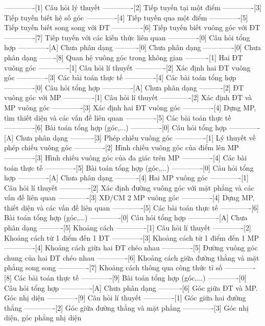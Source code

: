 -------------[1] Câu hỏi lý thuyết
-------------[2] Tiếp tuyến tại một điểm
-------------[3] Tiếp tuyến biết hệ số góc
-------------[4] Tiếp tuyến qua một điểm 
-------------[5] Tiếp tuyến biết song song với ĐT
-------------[6] Tiếp tuyến biết vuông góc với ĐT
-------------[7] Tiếp tuyến với các kiến thức liên quan
-------------[0] Câu hỏi tổng hợp
-------------[A] Chưa phân dạng
----------[0] Chưa phân dạng
-------------[0] Chưa phân dạng
-------[8] Quan hệ vuông góc trong không gian
----------[1] Hai ĐT vuông góc
-------------[1] Câu hỏi lí thuyết
-------------[2] Xác định hai ĐT vuông góc
-------------[3] Các bài toán thực tế
-------------[4] Các bài toán tổng hợp 
-------------[0] Câu hỏi tổng hợp
-------------[A] Chưa phân dạng
----------[2] ĐT vuông góc với MP
-------------[1] Câu hỏi lí thuyết
-------------[2] Xác định ĐT và MP vuông góc
-------------[3] Xác định hai ĐT vuông góc
-------------[4] Dựng MP, tìm thiết diện và các vấn đề liên quan
-------------[5] Các bài toán thực tế
-------------[6] Bài toán tổng hợp (góc,...)
-------------[0] Câu hỏi tổng hợp
-------------[A] Chưa phân dạng
----------[3] Phép chiếu vuông góc
-------------[1] Lý thuyết về phép chiếu vuông góc
-------------[2] Hình chiếu vuông góc của điểm lên MP
-------------[3] Hình chiếu vuông góc của đa giác trên MP
-------------[4] Các bài toán thực tế
-------------[5] Bài toán tổng hợp (góc,...)
-------------[0] Câu hỏi tổng hợp
-------------[A] Chưa phân dạng
----------[4] Hai MP vuông góc
-------------[1] Câu hỏi lí thuyết
-------------[2] Xác định đường vuông góc với mặt phẳng và các vấn đề liên quan
-------------[3] XĐ/CM 2 MP vuông góc
-------------[4] Dựng MP, thiết diện và các vấn đề liên quan
-------------[5] Các bài toán thực tế
-------------[6] Bài toán tổng hợp (góc,...)
-------------[0] Câu hỏi tổng hợp
-------------[A] Chưa phân dạng
----------[5] Khoảng cách
-------------[1] Câu hỏi lí thuyết
-------------[2] Khoảng cách từ 1 điểm đến 1 ĐT
-------------[3] Khoảng cách từ 1 điểm đến 1 MP
-------------[4] Khoảng cách giữa hai ĐT chéo nhau
-------------[5] Đường vuông góc chung của hai ĐT chéo nhau
-------------[6] Khoảng cách giữa đường thằng và mặt phẳng song song
-------------[7] Khoảng cách thông qua công thức tỉ số
-------------[8] Các bài toán thực tế
-------------[9] Bài toán tổng hợp (góc,...)
-------------[0] Câu hỏi tổng hợp
-------------[A] Chưa phân dạng
----------[6] Góc giữa ĐT và MP. Góc nhị diện
-------------[9] Câu hỏi lí thuyết
-------------[1] Góc giữa hai đường thẳng
-------------[2] Góc giữa đường thẳng và mặt phẳng
-------------[3] Góc nhị diện, góc phẳng nhị diện
